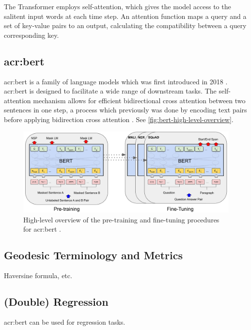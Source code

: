The Transformer employs self-attention, which gives the model access to the salitent input words at each time step. An attention function maps a query and a set of key-value pairs to an output, calculating the compatibility between a query corresponding key.

\subsection[BERT]{\acrshort{acr:bert}}

\gls{acr:bert} is a family of language models which was first introduced in 2018 \citep{devlinBERTPretrainingDeep2019}.
\acrshort{acr:bert} is designed to facilitate a wide range of downstream tasks. The self-attention mechanism allows for efficient bidirectional cross attention between two sentences in one step, a process which previously was done by encoding text pairs before applying bidirection cross attention \citep[5]{devlinBERTPretrainingDeep2019}. See \autoref{fig:bert-high-level-overview}.

\begin{figure}
    \centering
    \includegraphics*[width=\textwidth]{./figs/BERT_overall_procedures.jpg}
    \caption{High-level overview of the pre-training and fine-tuning procedures for \acrshort{acr:bert} \citep[3]{devlinBERTPretrainingDeep2019}.}
    \label{fig:bert-high-level-overview}
\end{figure}

\subsection{Geodesic Terminology and Metrics}

Haversine formula, etc.

\subsection{(Double) Regression}

\acrshort{acr:bert} can be used for regression tasks.
